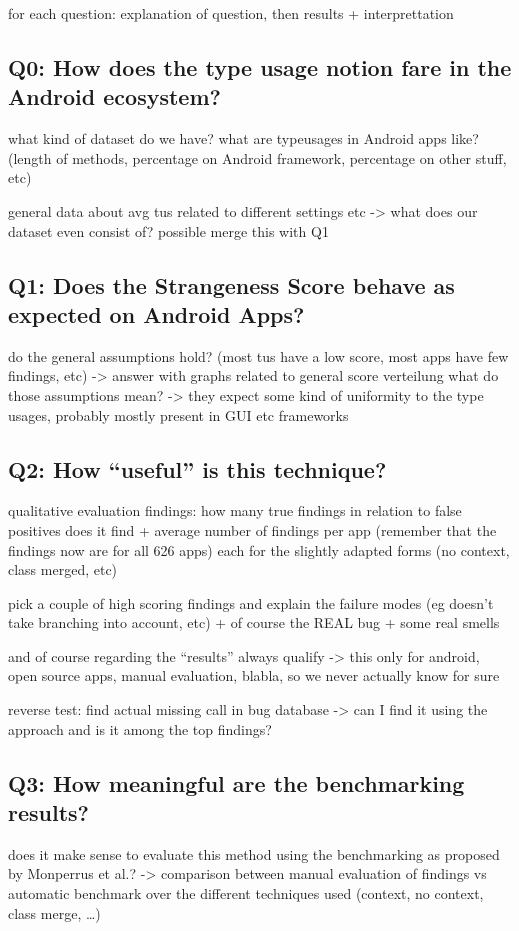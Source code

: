 for each question: explanation of question, then results + interprettation
\subsection{Q0: How does the type usage notion fare in the Android ecosystem?}
what kind of dataset do we have?
what are typeusages in Android apps like? (length of methods, percentage on Android framework, percentage on other stuff, etc)

general data about avg tus related to different settings etc -> what does our dataset even consist of?
possible merge this with Q1

\subsection{Q1: Does the Strangeness Score behave as expected on Android Apps?}

do the general assumptions hold? (most tus have a low score, most apps have few findings, etc)
    -> answer with graphs related to general score verteilung
    what do those assumptions mean? -> they expect some kind of uniformity to the type usages, probably mostly present in GUI etc frameworks

\subsection{Q2: How ``useful'' is this technique?}
qualitative evaluation findings:
how many true findings in relation to false positives does it find + average number of findings per app (remember that the findings now are for all 626 apps)
each for the slightly adapted forms (no context, class merged, etc)

pick a couple of high scoring findings and explain the failure modes (eg doesn't take branching into account, etc)
+ of course the REAL bug + some real smells

and of course regarding the ``results'' always qualify -> this only for android, open source apps, manual evaluation, blabla, so we never actually know for sure

reverse test: find actual missing call in bug database -> can I find it using the approach and is it among the top findings?

\subsection{Q3: How meaningful are the benchmarking results?}
does it make sense to evaluate this method using the benchmarking as proposed by Monperrus et al.?
-> comparison between manual evaluation of findings vs automatic benchmark over the different techniques used (context, no context, class merge, \ldots)

